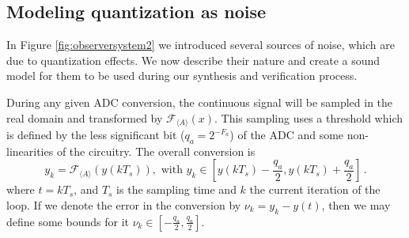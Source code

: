 \documentclass[sigconf]{llncs}
\newcommand{\mat}[1]{{#1}}
\renewcommand{\vec}[1]{{#1}}
\begin{document}
\subsection{Modeling quantization as noise} \label{sec:quantization-noise}
In Figure \ref{fig:observersystem2} we introduced
several sources of noise, which are due to quantization effects. We now describe
their nature and create a sound model for them to be used during our synthesis
and verification process.

%

During any given ADC conversion, the continuous signal will be sampled in
the real domain and transformed by $\mathcal{F}_{\langle A \rangle}
(x)$. This sampling uses a threshold which is defined by the
less significant bit ($q_{a}=2^{-F_a}$) 
of the ADC and some non-linearities of the circuitry.  The overall conversion is
%
$$\vec{y}_k=\mathcal{F}_{\langle A \rangle}\left(y(kT_s)\right), \text{ with }  \vec{y}_k \in \left[y(kT_s)-\frac{q_{a}}{2}, y(kT_s)+\frac{q_{a}}{2}\right] \,.$$
%
where $t = kT_s$, and $T_s$ is the sampling time and $k$ the current iteration of the loop.
If we denote the error in the conversion by $\nu_k=y_k-y(t)$, then we may define
some bounds for it $\nu_k \in [-\frac{q_{a}}{2}, \frac{q_{a}}{2}]$.
\end{document}

